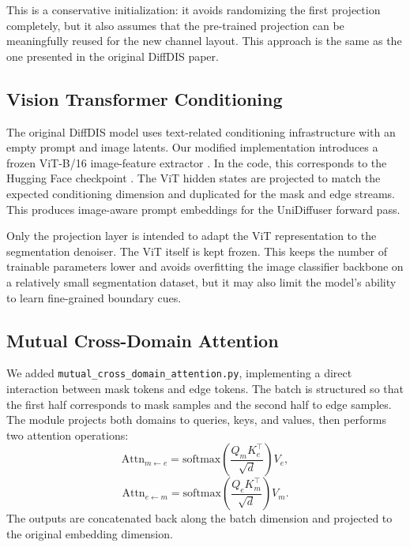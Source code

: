 \documentclass[sigconf,nonacm]{acmart}
\begin{document}
This is a conservative initialization: it avoids randomizing the first projection completely, but it also assumes that the pre-trained projection can be meaningfully reused for the new channel layout. This approach is the same as the one presented in the original DiffDIS paper.

\subsection{Vision Transformer Conditioning}
The original DiffDIS model uses text-related conditioning infrastructure with an empty prompt and image latents. Our modified implementation introduces a frozen ViT-B/16 image-feature extractor \cite{dosovitskiy2021vit}. In the code, this corresponds to the Hugging Face checkpoint . The ViT hidden states are projected to match the expected conditioning dimension and duplicated for the mask and edge streams. This produces image-aware prompt embeddings for the UniDiffuser forward pass.

Only the projection layer is intended to adapt the ViT representation to the segmentation denoiser. The ViT itself is kept frozen. This keeps the number of trainable parameters lower and avoids overfitting the image classifier backbone on a relatively small segmentation dataset, but it may also limit the model's ability to learn fine-grained boundary cues.

\subsection{Mutual Cross-Domain Attention}
We added \texttt{mutual\_cross\_domain\_attention.py}, implementing a direct interaction between mask tokens and edge tokens. The batch is structured so that the first half corresponds to mask samples and the second half to edge samples. The module projects both domains to queries, keys, and values, then performs two attention operations:
\begin{equation}
  \mathrm{Attn}_{m \leftarrow e} = \mathrm{softmax}\left(\frac{Q_m K_e^\top}{\sqrt{d}}\right)V_e,
\end{equation}
\begin{equation}
  \mathrm{Attn}_{e \leftarrow m} = \mathrm{softmax}\left(\frac{Q_e K_m^\top}{\sqrt{d}}\right)V_m.
\end{equation}
The outputs are concatenated back along the batch dimension and projected to the original embedding dimension.
\end{document}
